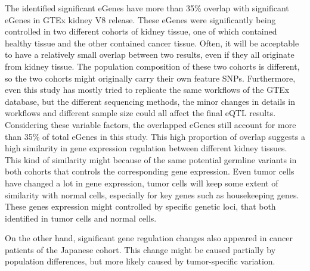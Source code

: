 The identified significant eGenes have more than 35\% overlap with significant eGenes in GTEx kidney V8 release. These eGenes were significantly being controlled in two different cohorts of kidney tissue, one of which contained healthy tissue and the other contained cancer tissue. Often, it will be acceptable to have a relatively small overlap between two results, even if they all originate from kidney tissue. The population composition of these two cohorts is different, so the two cohorts might originally carry their own feature SNPs. Furthermore, even this study has mostly tried to replicate the same workflows of the GTEx database, but the different sequencing methods, the minor changes in details in workflows and different sample size could all affect the final eQTL results. Considering these variable factors, the overlapped eGenes still account for more than 35\% of total eGenes in this study. This high proportion of overlap suggests a high similarity in gene expression regulation between different kidney tissues. This kind of similarity might because of the same potential germline variants in both cohorts that controls the corresponding gene expression. Even tumor cells have changed a lot in gene expression, tumor cells will keep some extent of similarity with normal cells, especially for key genes such as housekeeping genes. These genes expression might controlled by specific genetic loci, that both identified in tumor cells and normal cells. 

On the other hand, significant gene regulation changes also appeared in cancer patients of the Japanese cohort. This change might be caused partially by population differences, but more likely caused by tumor-specific variation. 

